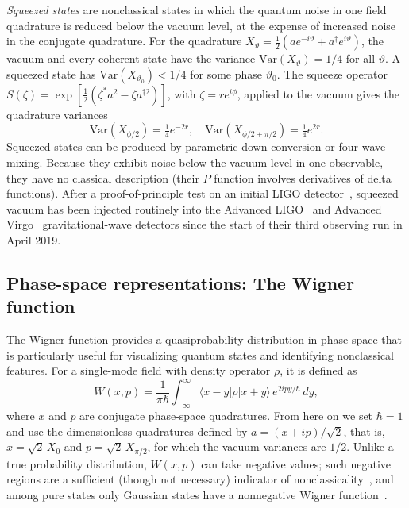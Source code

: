 \documentclass[%
 reprint,
 amsmath,amssymb,
 aps,
 floatfix,
]{revtex4-2}
\begin{document}
\textit{Squeezed states} are nonclassical states in which the quantum noise in one field quadrature is reduced below the vacuum level, at the expense of increased noise in the conjugate quadrature. For the quadrature $X_\vartheta = \tfrac{1}{2}(a e^{-i\vartheta} + a^\dagger e^{i\vartheta})$, the vacuum and every coherent state have the variance $\mathrm{Var}(X_\vartheta) = 1/4$ for all $\vartheta$. A squeezed state has $\mathrm{Var}(X_{\vartheta_0}) < 1/4$ for some phase $\vartheta_0$. The squeeze operator $S(\zeta) = \exp[\tfrac{1}{2}(\zeta^* a^2 - \zeta a^{\dagger 2})]$, with $\zeta = r e^{i\phi}$, applied to the vacuum gives the quadrature variances
\begin{equation}
\mathrm{Var}(X_{\phi/2}) = \tfrac{1}{4} e^{-2r}, \quad
\mathrm{Var}(X_{\phi/2 + \pi/2}) = \tfrac{1}{4} e^{2r}.
\label{eq:squeeze}
\end{equation}
Squeezed states can be produced by parametric down-conversion or four-wave mixing. Because they exhibit noise below the vacuum level in one observable, they have no classical description (their $P$ function involves derivatives of delta functions). After a proof-of-principle test on an initial LIGO detector~\cite{aasi2013}, squeezed vacuum has been injected routinely into the Advanced LIGO~\cite{tse2019} and Advanced Virgo~\cite{acernese2019} gravitational-wave detectors since the start of their third observing run in April 2019.


\subsection{Phase-space representations: The Wigner function}
\label{sec:wigner}

The Wigner function provides a quasiprobability distribution in phase space that is particularly useful for visualizing quantum states and identifying nonclassical features. For a single-mode field with density operator $\rho$, it is defined as~\cite{wigner1932}
\begin{equation}
W(x, p) = \frac{1}{\pi\hbar} \int_{-\infty}^{\infty} \langle x - y | \rho | x + y \rangle \, e^{2ipy/\hbar} \, dy,
\label{eq:wigner_def}
\end{equation}
where $x$ and $p$ are conjugate phase-space quadratures. From here on we set $\hbar = 1$ and use the dimensionless quadratures defined by $a = (x + ip)/\sqrt{2}$, that is, $x = \sqrt{2}\,X_0$ and $p = \sqrt{2}\,X_{\pi/2}$, for which the vacuum variances are $1/2$. Unlike a true probability distribution, $W(x,p)$ can take negative values; such negative regions are a sufficient (though not necessary) indicator of nonclassicality~\cite{kenfack2004}, and among pure states only Gaussian states have a nonnegative Wigner function~\cite{hudson1974}.
\end{document}
